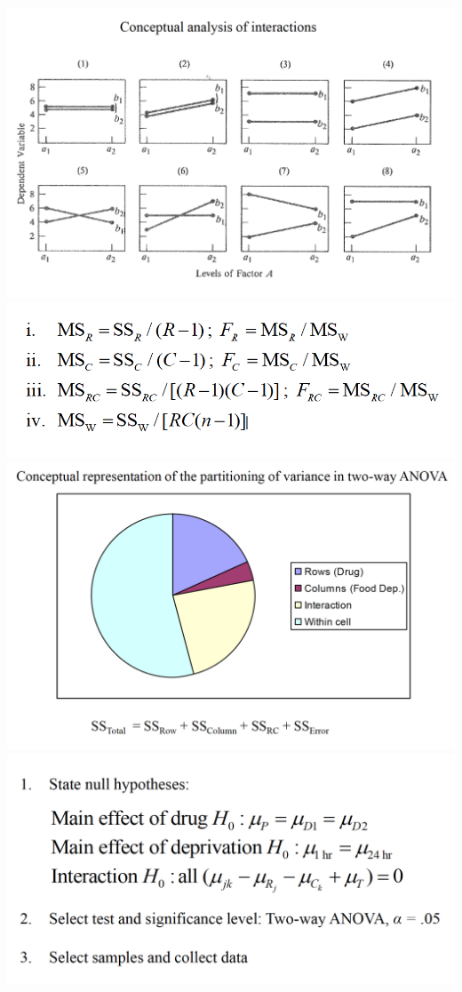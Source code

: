 \documentclass[]{book}
\theoremstyle{definition}
\theoremstyle{definition}
\theoremstyle{definition}
\theoremstyle{remark}
\begin{document}
\includegraphics{img/hicksfa6.png} \includegraphics{img/hicksfa7.png}
\includegraphics{img/hicksfa8.png} \includegraphics{img/hicksfa9.png}
\end{document}
